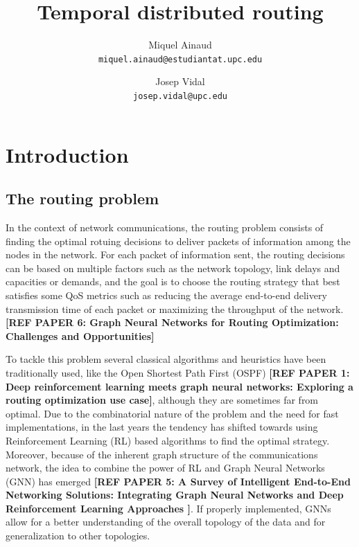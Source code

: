 \documentclass[10pt,twocolumn,letterpaper]{article}
\begin{document}
\title{Temporal distributed routing}

\author{Miquel Ainaud\\
{\tt\small miquel.ainaud@estudiantat.upc.edu}
\and
Josep Vidal\\
{\tt\small josep.vidal@upc.edu}
}

\maketitle

\begin{abstract}

\end{abstract}

\section{Introduction}
\subsection{The routing problem}

In the context of network communications, the routing problem consists of finding the optimal rotuing decisions to deliver packets of information among the nodes in the network. For each packet of information sent, the routing decisions can be based on multiple factors such as the network topology, link delays and capacities or demands, and the goal is to choose the routing strategy that best satisfies some QoS metrics such as reducing the average end-to-end delivery transmission time of each packet or maximizing the throughput of the network.
\textbf{[REF PAPER 6: Graph Neural Networks for Routing Optimization: Challenges and Opportunities]}

To tackle this problem several classical algorithms and heuristics have been traditionally used, like the Open Shortest Path First (OSPF) \textbf{[REF PAPER 1: Deep reinforcement learning meets graph neural networks: Exploring a
routing optimization use case]}, although they are sometimes far from optimal. Due to the combinatorial nature of the problem and the need for fast implementations, in the last years the tendency has shifted towards using Reinforcement Learning (RL) based algorithms to find the optimal strategy. Moreover, because of the inherent graph structure of the communications network, the idea to combine the power of RL and Graph Neural Networks (GNN) has emerged \textbf{[REF PAPER 5: A Survey of Intelligent End-to-End Networking Solutions: Integrating Graph Neural Networks and Deep Reinforcement Learning Approaches  ]}. If properly implemented, GNNs allow for a better understanding of the overall topology of the data and for generalization to other topologies.
\end{document}
